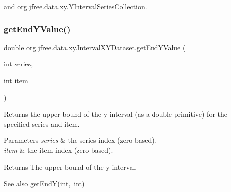 and \mbox{\hyperlink{classorg_1_1jfree_1_1data_1_1xy_1_1_y_interval_series_collection_a93694e5bea9406c2ac871815d6a3c038}{org.\+jfree.\+data.\+xy.\+Y\+Interval\+Series\+Collection}}.

\mbox{\label{interfaceorg_1_1jfree_1_1data_1_1xy_1_1_interval_x_y_dataset_a0538ada774aad34ec95edbb84c1a82e1}} 
\subsubsection{\texorpdfstring{get\+End\+Y\+Value()}{getEndYValue()}}
{\footnotesize\ttfamily double org.\+jfree.\+data.\+xy.\+Interval\+X\+Y\+Dataset.\+get\+End\+Y\+Value (\begin{DoxyParamCaption}\item[{int}]{series,  }\item[{int}]{item }\end{DoxyParamCaption})}

Returns the upper bound of the y-\/interval (as a double primitive) for the specified series and item.


\begin{DoxyParams}{Parameters}
{\em series} & the series index (zero-\/based). \\
\hline
{\em item} & the item index (zero-\/based).\\
\hline
\end{DoxyParams}
\begin{DoxyReturn}{Returns}
The upper bound of the y-\/interval.
\end{DoxyReturn}
\begin{DoxySeeAlso}{See also}
\mbox{\hyperlink{interfaceorg_1_1jfree_1_1data_1_1xy_1_1_interval_x_y_dataset_ae938af574bad07e7f47a8b423223ef9b}{get\+End\+Y(int, int)}} 
\end{DoxySeeAlso}


